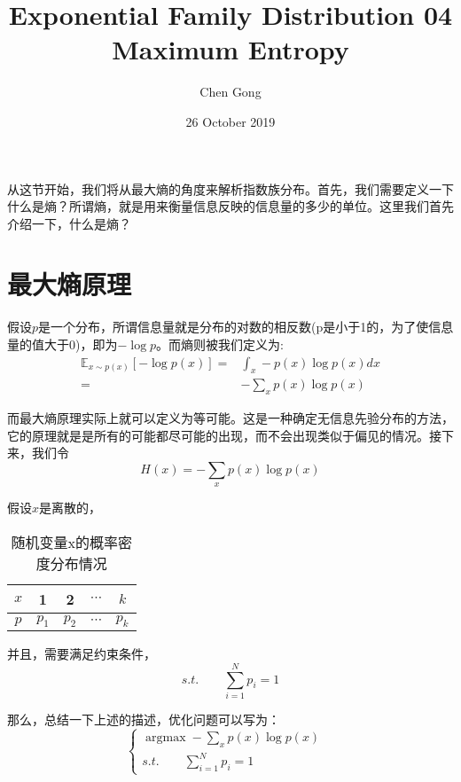 \documentclass[a4paper]{article}
\title{Exponential Family Distribution 04 Maximum Entropy}
\author{Chen Gong}
\date{26 October 2019}
\DeclareMathOperator*{\argmax}{argmax}
\begin{document}
\maketitle
从这节开始，我们将从最大熵的角度来解析指数族分布。首先，我们需要定义一下什么是熵？所谓熵，就是用来衡量信息反映的信息量的多少的单位。这里我们首先介绍一下，什么是熵？

\section{最大熵原理}
假设$p$是一个分布，所谓信息量就是分布的对数的相反数(p是小于1的，为了使信息量的值大于0)，即为$-\log p$。而熵则被我们定义为:
\begin{equation}
    \begin{split}
        \mathbb{E}_{x\sim p(x)}[-\log p(x)]= & \int_{x} -p(x)\log p(x) dx \\
        = & - \sum_{x} p(x)\log p(x)
    \end{split}
\end{equation}

而最大熵原理实际上就可以定义为等可能。这是一种确定无信息先验分布的方法，它的原理就是是所有的可能都尽可能的出现，而不会出现类似于偏见的情况。接下来，我们令
\begin{equation}
    H(x)=-\sum_x p(x)\log p(x)
\end{equation}

假设$x$是离散的，
\begin{table}[H]
    \centering
    \begin{tabular}{c|cccc}
         $x$ & 1 & 2 & $\cdots$ & $k$ \\
         \hline
         $p$ & $p_1$ & $p_2$ & $\cdots$ & $p_k$ \\ 
    \end{tabular}
    \caption{随机变量x的概率密度分布情况}
    \label{tab:my_label}
\end{table}

并且，需要满足约束条件，
\begin{equation}
    s.t. \qquad \sum_{i=1}^Np_i=1
\end{equation}

那么，总结一下上述的描述，优化问题可以写为：
\begin{equation}
    \left\{
    \begin{array}{ll}
         \mathop{\argmax} -\sum_x p(x)\log p(x) & \\
         s.t. \qquad \sum_{i=1}^Np_i=1 &
    \end{array}
    \right.
\end{equation}
\end{document}
